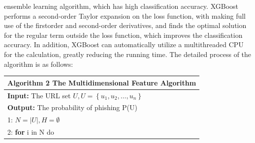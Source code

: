 \documentclass{ieeeaccess}
\begin{document}
ensemble learning algorithm, which has high classification
accuracy. XGBoost performs a second-order Taylor expansion
on the loss function, with making full use of the firstorder
and second-order derivatives, and finds the optimal
solution for the regular term outside the loss function, which
improves the classification accuracy. In addition, XGBoost
can automatically utilize a multithreaded CPU for the calculation,
greatly reducing the running time. The detailed process
of the algorithm is as follows:
\begin{table}[htp]
\begin{tabular}{l}
\hline
\textbf{Algorithm 2} The Multidimensional Feature Algorithm                                                                                                                                                                                                                         \\ \hline
\textbf{Input:} The URL set $U, U=\left\{u_{1}, u_{2}, \ldots, u_{n}\right\}$                                                                                           \\
\textbf{Output:} The probability of phishing P(U)                                                                                                                                                              \\
1: $N=|U|, H=\emptyset$                                                                                                                                                                                           \\
    
2: \textbf{for} i in N do \\


\end{tabular}
\end{table}
\end{document}
